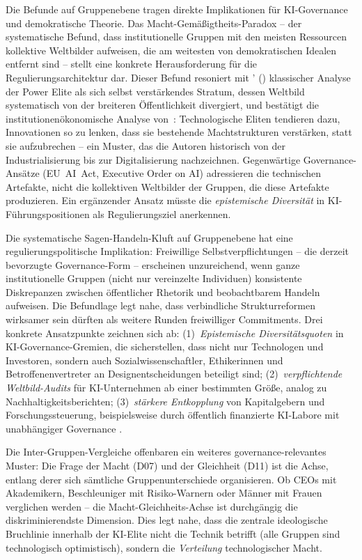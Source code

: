 \documentclass[12pt,a4paper]{article}
\begin{document}
Die Befunde auf Gruppenebene tragen direkte Implikationen für KI-Governance und demokratische Theorie. Das Macht-Gemäßigtheits-Paradox -- der systematische Befund, dass institutionelle Gruppen mit den meisten Ressourcen kollektive Weltbilder aufweisen, die am weitesten von demokratischen Idealen entfernt sind -- stellt eine konkrete Herausforderung für die Regulierungsarchitektur dar. Dieser Befund resoniert mit \citeauthor{Mills1956}' (\citeyear{Mills1956}) klassischer Analyse der \glqq Power Elite\grqq{} als sich selbst verstärkendes Stratum, dessen Weltbild systematisch von der breiteren Öffentlichkeit divergiert, und bestätigt die institutionenökonomische Analyse von~\citet{AcemogluJohnson2023}: Technologische Eliten tendieren dazu, Innovationen so zu lenken, dass sie bestehende Machtstrukturen verstärken, statt sie aufzubrechen -- ein Muster, das die Autoren historisch von der Industrialisierung bis zur Digitalisierung nachzeichnen. Gegenwärtige Governance-Ansätze (EU~AI~Act, Executive Order on AI) adressieren die technischen Artefakte, nicht die kollektiven Weltbilder der Gruppen, die diese Artefakte produzieren. Ein ergänzender Ansatz müsste die \emph{epistemische Diversität} in KI-Führungspositionen als Regulierungsziel anerkennen.

Die systematische Sagen-Handeln-Kluft auf Gruppenebene hat eine regulierungspolitische Implikation: Freiwillige Selbstverpflichtungen -- die derzeit bevorzugte Governance-Form \citep[vgl.][]{Bengio2024} -- erscheinen unzureichend, wenn ganze institutionelle Gruppen (nicht nur vereinzelte Individuen) konsistente Diskrepanzen zwischen öffentlicher Rhetorik und beobachtbarem Handeln aufweisen. Die Befundlage legt nahe, dass verbindliche Strukturreformen wirksamer sein dürften als weitere Runden freiwilliger Commitments. Drei konkrete Ansatzpunkte zeichnen sich ab: (1)~\emph{Epistemische Diversitätsquoten} in KI-Governance-Gremien, die sicherstellen, dass nicht nur Technologen und Investoren, sondern auch Sozialwissenschaftler, Ethikerinnen und Betroffenenvertreter an Designentscheidungen beteiligt sind; (2)~\emph{verpflichtende Weltbild-Audits} für KI-Unternehmen ab einer bestimmten Größe, analog zu Nachhaltigkeitsberichten; (3)~\emph{stärkere Entkopplung} von Kapitalgebern und Forschungssteuerung, beispielsweise durch öffentlich finanzierte KI-Labore mit unabhängiger Governance \citep[vgl.][]{AcemogluJohnson2023}.

Die Inter-Gruppen-Vergleiche offenbaren ein weiteres governance-relevantes Muster: Die Frage der Macht (D07) und der Gleichheit (D11) ist die Achse, entlang derer sich sämtliche Gruppenunterschiede organisieren. Ob CEOs mit Akademikern, Beschleuniger mit Risiko-Warnern oder Männer mit Frauen verglichen werden -- die Macht-Gleichheits-Achse ist durchgängig die diskriminierendste Dimension. Dies legt nahe, dass die zentrale ideologische Bruchlinie innerhalb der KI-Elite nicht die Technik betrifft (alle Gruppen sind technologisch optimistisch), sondern die \emph{Verteilung} technologischer Macht.
\end{document}
